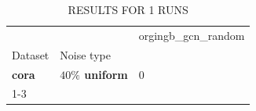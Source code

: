 \begin{table}
\caption{RESULTS FOR 1 RUNS}
\begin{tabular}{lll}
\toprule
 &  & orgingb_gcn_random \\
Dataset & Noise type &  \\
\midrule
\textbf{cora} & \textbf{$ 40 \% $ uniform} & 0 \\
\cline{1-3}
\bottomrule
\end{tabular}
\end{table}
